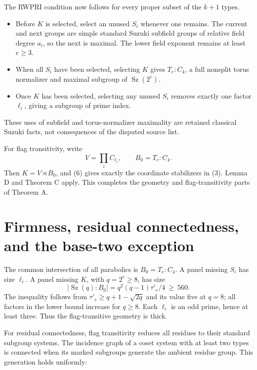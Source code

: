 \documentclass[11pt,a4paper]{article}
\providecommand{\tightlist}{\setlength{\itemsep}{0pt}\setlength{\parskip}{0pt}}
\begin{document}
The RWPRI condition now follows for every proper subset of the \(k+1\)
types.

\begin{itemize}
\tightlist
\item
  Before \(K\) is selected, select an unused \(S_i\) whenever one
  remains. The current and next groups are simple standard Suzuki
  subfield groups of relative field degree \(a_i\), so the next is
  maximal. The lower field exponent remains at least \(e\ge3\).
\item
  When all \(S_i\) have been selected, selecting \(K\) gives
  \(T_e:C_4\), a full nonsplit torus normalizer and maximal subgroup of
  \(\operatorname{Sz}(2^e)\).
\item
  Once \(K\) has been selected, selecting any unused \(S_i\) removes
  exactly one factor \(\ell_i\), giving a subgroup of prime index.
\end{itemize}

These uses of subfield and torus-normalizer maximality are retained
classical Suzuki facts, not consequences of the disputed source list.

For flag transitivity, write \[
V=\prod_i C_{\ell_i},\qquad B_0=T_e:C_4.
\] Then \(K=V\rtimes B_0\), and (6) gives exactly the coordinate
stabilizers in (3). Lemma D and Theorem C apply. This completes the
geometry and flag-transitivity parts of Theorem A.

\section{Firmness, residual connectedness, and the base-two
exception}\label{firmness-residual-connectedness-and-the-base-two-exception}

The common intersection of all parabolics is \(B_0=T_e:C_4\). A panel
missing \(S_i\) has size \(\ell_i\). A panel missing \(K\), with
\(q=2^e\ge8\), has size \[
|\operatorname{Sz}(q):B_0|=q^2(q-1)\tau'_e/4\ \ge\ 560.
\] The inequality follows from \(\tau'_e\ge q+1-\sqrt{2q}\) and its
value five at \(q=8\); all factors in the lower bound increase for
\(q\ge8\). Each \(\ell_i\) is an odd prime, hence at least three. Thus
the flag-transitive geometry is thick.

For residual connectedness, flag transitivity reduces all residues to
their standard subgroup systems. The incidence graph of a coset system
with at least two types is connected when its marked subgroups generate
the ambient residue group. This generation holds uniformly:
\end{document}
